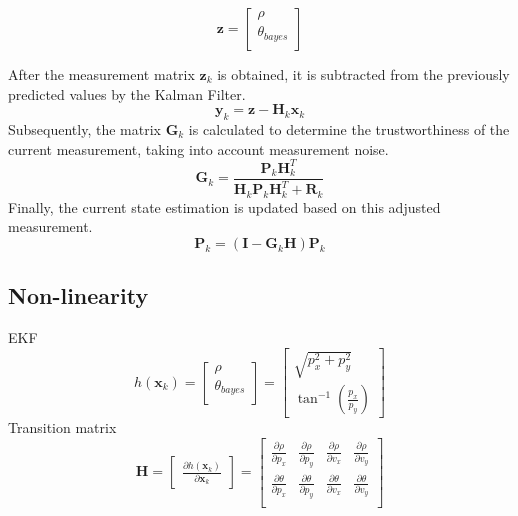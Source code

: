 \begin{equation}
    \mathbf{z}=
    \begin{bmatrix}
        \rho \\ 
        \theta_{bayes}\\
    \end{bmatrix}
\end{equation}


After the measurement matrix $\mathbf{z}_k$ is obtained, 
it is subtracted from the previously predicted values by the Kalman Filter. 
\begin{equation}
    \mathbf{y}_{k}=\mathbf{z}-\mathbf{H}_k \mathbf{x}_k
\end{equation}
Subsequently, the matrix $ \mathbf{G}_k $ is calculated to determine the trustworthiness of the current measurement, taking into account measurement noise. 
\begin{equation}
    \mathbf{G}_k = \frac{\mathbf{P}_k \mathbf{H}_k^T}{\mathbf{H}_k\mathbf{P}_k\mathbf{H}_k^T + \mathbf{R}_k}
\end{equation}
Finally, the current state estimation is updated based on this adjusted measurement.
\begin{equation}
    \mathbf{P}_k = (\mathbf{I} - \mathbf{G}_k\mathbf{H})\mathbf{P}_k
\end{equation}

\newpage

\subsection{Non-linearity}\label{equ:2_non_linear}
EKF
\begin{equation}
    h(\mathbf{x}_k)=
    \begin{bmatrix}
        \rho \\ 
        \theta_{bayes}\\
    \end{bmatrix}=
    \begin{bmatrix}
    \sqrt{p_x^2+p_y^2}\\
    \tan^{-1}(\frac{p_x}{p_y})
    \end{bmatrix}
    \end{equation}
    Transition matrix
    \begingroup
        \large
        \begin{equation}
            \mathbf{H}=
            \begin{bmatrix}
                \frac{\partial h(\mathbf{x}_k)}{\partial \mathbf{x}_k}
            \end{bmatrix}=
            \begin{bmatrix}
                \frac{\partial \rho}{\partial p_x} & \frac{\partial \rho}{\partial p_y}
                & \frac{\partial \rho}{\partial v_x}& \frac{\partial \rho}{\partial v_y} \\
        
                \frac{\partial \theta}{\partial p_x} & \frac{\partial \theta}{\partial p_y} 
                & \frac{\partial \theta}{\partial v_x}& \frac{\partial \theta}{\partial v_y} \\
            \end{bmatrix}
        \end{equation}
        
